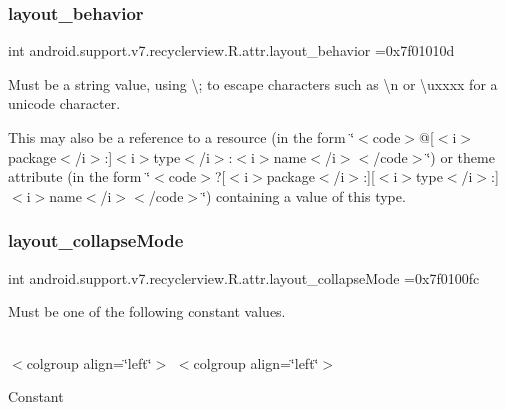 \subsubsection{\texorpdfstring{layout\+\_\+behavior}{layout\_behavior}}
{\footnotesize\ttfamily int android.\+support.\+v7.\+recyclerview.\+R.\+attr.\+layout\+\_\+behavior =0x7f01010d\hspace{0.3cm}{\ttfamily [static]}}

Must be a string value, using \textquotesingle{}\textbackslash{};\textquotesingle{} to escape characters such as \textquotesingle{}\textbackslash{}n\textquotesingle{} or \textquotesingle{}\textbackslash{}uxxxx\textquotesingle{} for a unicode character. 

This may also be a reference to a resource (in the form \char`\"{}$<$code$>$@\mbox{[}$<$i$>$package$<$/i$>$\+:\mbox{]}$<$i$>$type$<$/i$>$\+:$<$i$>$name$<$/i$>$$<$/code$>$\char`\"{}) or theme attribute (in the form \char`\"{}$<$code$>$?\mbox{[}$<$i$>$package$<$/i$>$\+:\mbox{]}\mbox{[}$<$i$>$type$<$/i$>$\+:\mbox{]}$<$i$>$name$<$/i$>$$<$/code$>$\char`\"{}) containing a value of this type. \mbox{\label{classandroid_1_1support_1_1v7_1_1recyclerview_1_1R_1_1attr_aab69032f9aa301bf80799ba24ddecf4b}} 
\subsubsection{\texorpdfstring{layout\+\_\+collapse\+Mode}{layout\_collapseMode}}
{\footnotesize\ttfamily int android.\+support.\+v7.\+recyclerview.\+R.\+attr.\+layout\+\_\+collapse\+Mode =0x7f0100fc\hspace{0.3cm}{\ttfamily [static]}}

Must be one of the following constant values.

\tabulinesep=1mm
\begin{longtabu} spread 0pt [c]{*{0}{|X[-1]}|}
\hline
\end{longtabu}
$<$colgroup align=\char`\"{}left\char`\"{}$>$ $<$colgroup align=\char`\"{}left\char`\"{}$>$ 

Constant


